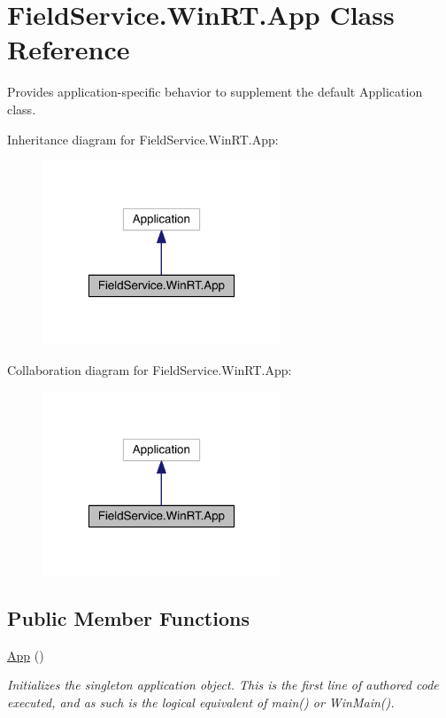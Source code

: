 \hypertarget{class_field_service_1_1_win_r_t_1_1_app}{\section{Field\+Service.\+Win\+R\+T.\+App Class Reference}
\label{class_field_service_1_1_win_r_t_1_1_app}
}


Provides application-\/specific behavior to supplement the default Application class.  




Inheritance diagram for Field\+Service.\+Win\+R\+T.\+App\+:
\nopagebreak
\begin{figure}[H]
\begin{center}
\leavevmode
\includegraphics[width=202pt]{class_field_service_1_1_win_r_t_1_1_app__inherit__graph}
\end{center}
\end{figure}


Collaboration diagram for Field\+Service.\+Win\+R\+T.\+App\+:
\nopagebreak
\begin{figure}[H]
\begin{center}
\leavevmode
\includegraphics[width=202pt]{class_field_service_1_1_win_r_t_1_1_app__coll__graph}
\end{center}
\end{figure}
\subsection*{Public Member Functions}
\begin{DoxyCompactItemize}
\item 
\hyperlink{class_field_service_1_1_win_r_t_1_1_app_ac7793189b86e63a4062856394c916143}{App} ()
\begin{DoxyCompactList}\small\item\em Initializes the singleton application object. This is the first line of authored code executed, and as such is the logical equivalent of main() or Win\+Main(). \end{DoxyCompactList}\end{DoxyCompactItemize}
